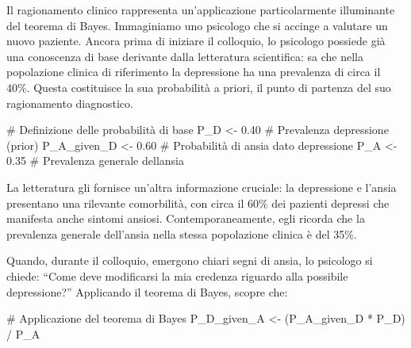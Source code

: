 \documentclass[
  letterpaper,
  DIV=11,
  numbers=noendperiod,
  oneside]{scrreprt}
\newenvironment{Shaded}{\begin{snugshade}}{\end{snugshade}}
\newcommand{\CommentTok}[1]{\textcolor[rgb]{0.37,0.37,0.37}{#1}}
\newcommand{\FloatTok}[1]{\textcolor[rgb]{0.68,0.00,0.00}{#1}}
\newcommand{\NormalTok}[1]{\textcolor[rgb]{0.00,0.23,0.31}{#1}}
\newcommand{\OtherTok}[1]{\textcolor[rgb]{0.00,0.23,0.31}{#1}}
\newcommand{\SpecialCharTok}[1]{\textcolor[rgb]{0.37,0.37,0.37}{#1}}
\theoremstyle{definition}
\theoremstyle{plain}
\theoremstyle{definition}
\theoremstyle{remark}
\begin{document}
\begin{tcolorbox}[enhanced jigsaw, arc=.35mm, breakable, colbacktitle=quarto-callout-note-color!10!white, opacityback=0, toprule=.15mm, rightrule=.15mm, colback=white, opacitybacktitle=0.6, leftrule=.75mm, coltitle=black, bottomtitle=1mm, left=2mm, toptitle=1mm, title=\textcolor{quarto-callout-note-color}{\faInfo}\hspace{0.5em}{Comorbilità e aggiornamento delle credenze diagnostiche}, titlerule=0mm, bottomrule=.15mm, colframe=quarto-callout-note-color-frame]

Il ragionamento clinico rappresenta un'applicazione particolarmente
illuminante del teorema di Bayes. Immaginiamo uno psicologo che si
accinge a valutare un nuovo paziente. Ancora prima di iniziare il
colloquio, lo psicologo possiede già una conoscenza di base derivante
dalla letteratura scientifica: sa che nella popolazione clinica di
riferimento la depressione ha una prevalenza di circa il 40\%. Questa
costituisce la sua probabilità a priori, il punto di partenza del suo
ragionamento diagnostico.

\begin{Shaded}
\begin{Highlighting}[]
\CommentTok{\# Definizione delle probabilità di base}
\NormalTok{P\_D }\OtherTok{\textless{}{-}} \FloatTok{0.40}          \CommentTok{\# Prevalenza depressione (prior)}
\NormalTok{P\_A\_given\_D }\OtherTok{\textless{}{-}} \FloatTok{0.60}  \CommentTok{\# Probabilità di ansia dato depressione}
\NormalTok{P\_A }\OtherTok{\textless{}{-}} \FloatTok{0.35}          \CommentTok{\# Prevalenza generale dell\textquotesingle{}ansia}
\end{Highlighting}
\end{Shaded}

La letteratura gli fornisce un'altra informazione cruciale: la
depressione e l'ansia presentano una rilevante comorbilità, con circa il
60\% dei pazienti depressi che manifesta anche sintomi ansiosi.
Contemporaneamente, egli ricorda che la prevalenza generale dell'ansia
nella stessa popolazione clinica è del 35\%.

Quando, durante il colloquio, emergono chiari segni di ansia, lo
psicologo si chiede: ``Come deve modificarsi la mia credenza riguardo
alla possibile depressione?'' Applicando il teorema di Bayes, scopre
che:

\begin{Shaded}
\begin{Highlighting}[]
\CommentTok{\# Applicazione del teorema di Bayes}
\NormalTok{P\_D\_given\_A }\OtherTok{\textless{}{-}}\NormalTok{ (P\_A\_given\_D }\SpecialCharTok{*}\NormalTok{ P\_D) }\SpecialCharTok{/}\NormalTok{ P\_A}


\end{Highlighting}
\end{Shaded}
\end{tcolorbox}
\end{document}
